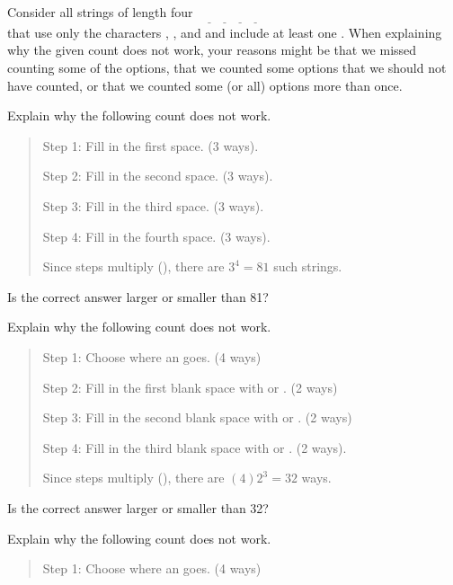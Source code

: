 \begin{act}
\label{act_counting_incorrectly}
    Consider all strings of length four 
        $$\underline{\quad}~\underline{\quad}
        ~\underline{\quad}
        ~\underline{\quad}~$$
    that use only the characters , , and  and include at least one .
    When explaining why the given count does not work, your reasons might be that we missed counting some of the options, that we counted some options that we should not have counted, or that we counted some (or all) options more than once.
    \begin{actpart}
            \item Explain why the following count does not work.  
        
        \begin{quote}
            Step 1: Fill in the first space. (3 ways). 
        
            Step 2: Fill in the second space. (3 ways). 
        
            Step 3: Fill in the third space. (3 ways). 
        
            Step 4: Fill in the fourth space. (3 ways).
        
            Since steps multiply (), there are $3^4=81$ such strings.    
        \end{quote}        
        Is the correct answer larger or smaller than 81?
                \item Explain why the following count does not work. 

        \begin{quote}
            Step 1: Choose where an  goes. (4 ways)  
        
            Step 2:  Fill in the first blank space with  or . (2 ways) 
        
            Step 3: Fill in the second blank space with  or . (2 ways)  
        
            Step 4: Fill in the third blank space with  or . (2 ways).  
        
            Since steps multiply (), there are $(4)2^3 = 32$ ways.                     
        \end{quote}       
        Is the correct answer larger or smaller than 32?
        \item Explain why the following count does not work.  
        \begin{quote}           
            Step 1: Choose where an  goes. (4 ways) 
            

\end{quote}
\end{actpart}
\end{act}
